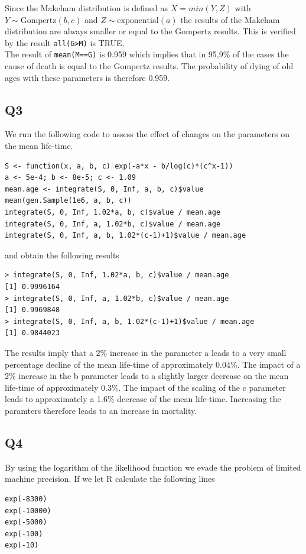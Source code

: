 Since the Makeham distribution is defined as $X = min(Y,Z)$ with $Y \sim \text{Gompertz}(b,c)$ and $Z \sim \text{exponential}(a)$ the results of the Makeham distribution are always smaller or equal to the Gompertz results. This is verified by the result \verb+all(G>M)+ is TRUE. \\
The result of \verb+mean(M==G)+ is 0.959 which implies that in 95,9\% of the cases the cause of death is equal to the Gompertz results. The probability of dying of old ages with these parameters is therefore 0.959.

\subsection*{Q3}
We run the following code to assess the effect of changes on the parameters on the mean life-time.
\begin{verbatim}
S <- function(x, a, b, c) exp(-a*x - b/log(c)*(c^x-1))
a <- 5e-4; b <- 8e-5; c <- 1.09
mean.age <- integrate(S, 0, Inf, a, b, c)$value 
mean(gen.Sample(1e6, a, b, c))
integrate(S, 0, Inf, 1.02*a, b, c)$value / mean.age
integrate(S, 0, Inf, a, 1.02*b, c)$value / mean.age
integrate(S, 0, Inf, a, b, 1.02*(c-1)+1)$value / mean.age
\end{verbatim}
and obtain the following results
\begin{verbatim}
> integrate(S, 0, Inf, 1.02*a, b, c)$value / mean.age
[1] 0.9996164
> integrate(S, 0, Inf, a, 1.02*b, c)$value / mean.age
[1] 0.9969848
> integrate(S, 0, Inf, a, b, 1.02*(c-1)+1)$value / mean.age
[1] 0.9844023
\end{verbatim}
The results imply that a 2\% increase in the parameter a leads to a very small percentage decline of the mean life-time of approximately 0.04\%. The impact of a 2\% increase in the b parameter leads to a slightly larger decrease on the mean life-time of approximately 0.3\%. The impact of the scaling of the c parameter leads to approximately a 1.6\% decrease of the mean life-time. Increasing the paramters therefore leads to an increase in mortality.

\subsection*{Q4}

By using the logarithm of the likelihood function we evade the problem of limited machine precision. If we let R calculate the following lines

\begin{verbatim}
exp(-8300)
exp(-10000)
exp(-5000)
exp(-100)
exp(-10)
\end{verbatim}

